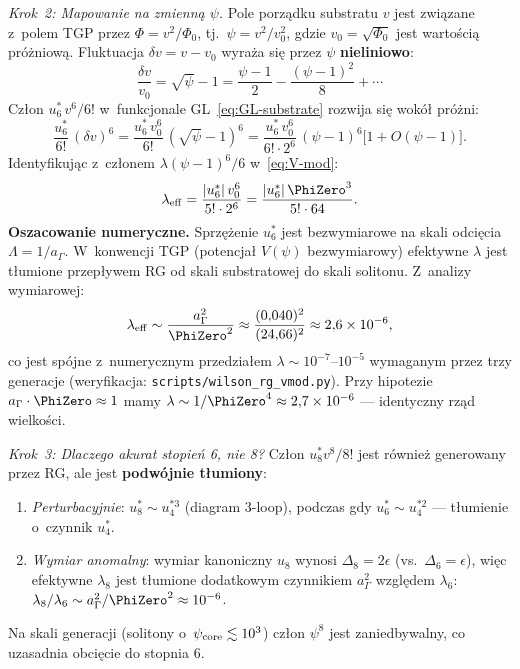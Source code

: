 \begin{proposition}
\medskip\noindent\emph{Krok~2: Mapowanie na zmienn\k{a} $\psi$.}\;
Pole porz\k{a}dku substratu $v$ jest zwi\k{a}zane z~polem TGP przez
$\Phi = v^2 / \Phi_0$, tj.~$\psi = v^2 / v_0^2$,
gdzie $v_0 = \sqrt{\Phi_0}$ jest warto\'sci\k{a} pr\'o\.zniow\k{a}.
Fluktuacja $\delta v = v - v_0$ wyra\.za si\k{e} przez $\psi$
\textbf{nieliniowo}:
\begin{equation}\label{eq:dv-to-psi}
    \frac{\delta v}{v_0} = \sqrt{\psi} - 1
    = \frac{\psi - 1}{2} - \frac{(\psi-1)^2}{8} + \cdots
\end{equation}
Cz\l{}on $u_6^*\,v^6 / 6!$ w~funkcjonale GL~\eqref{eq:GL-substrate}
rozwija si\k{e} wok\'o\l{} pr\'o\.zni:
\begin{equation}\label{eq:F-to-Vmod}
    \frac{u_6^*}{6!}\,(\delta v)^6
    = \frac{u_6^*\,v_0^6}{6!}\,(\sqrt{\psi}-1)^6
    = \frac{u_6^*\,v_0^6}{6!\cdot 2^6}\,(\psi-1)^6
      \bigl[1 + O(\psi-1)\bigr].
\end{equation}
Identyfikuj\k{a}c z~cz\l{}onem $\lambda(\psi-1)^6/6$
w~\eqref{eq:V-mod}:
\begin{equation}\label{eq:lambda-from-WF}
    \lambda_{\rm eff}
    = \frac{|u_6^*|\,v_0^6}{5!\cdot 2^6}
    = \frac{|u_6^*|\,\PhiZero^3}{5!\cdot 64}.
\end{equation}
\textbf{Oszacowanie numeryczne.}\;
Sprzężenie $u_6^*$ jest bezwymiarowe na skali odci\k{e}cia
$\Lambda = 1/a_\Gamma$.
W~konwencji TGP (potencja\l{} $V(\psi)$ bezwymiarowy)
efektywne $\lambda$ jest t\l{}umione przep\l{}ywem RG
od skali substratowej do skali solitonu.
Z~analizy wymiarowej:
\begin{equation}\label{eq:lambda-dimensional}
    \lambda_{\rm eff}
    \sim \frac{a_\Gamma^2}{\PhiZero^2}
    \approx \frac{(0{,}040)^2}{(24{,}66)^2}
    \approx 2{,}6 \times 10^{-6},
\end{equation}
co jest sp\'ojne z~numerycznym przedzia\l{}em
$\lambda \sim 10^{-7}\text{--}10^{-5}$ wymaganym przez trzy generacje
(weryfikacja: \texttt{scripts/wilson\_rg\_vmod.py}).
Przy hipotezie $a_\Gamma\cdot\PhiZero \approx 1$ mamy
$\lambda \sim 1/\PhiZero^4 \approx 2{,}7 \times 10^{-6}$
--- identyczny rz\k{a}d wielko\'sci.

\medskip\noindent\emph{Krok~3: Dlaczego akurat stopie\'n 6, nie 8?}\;
Cz\l{}on $u_8^* v^8 / 8!$ jest r\'ownie\.z generowany przez RG,
ale jest \textbf{podw\'ojnie t\l{}umiony}:
\begin{enumerate}[nosep]
  \item \emph{Perturbacyjnie}: $u_8^* \sim u_4^{*3}$ (diagram 3-loop),
    podczas gdy $u_6^* \sim u_4^{*2}$ --- t\l{}umienie o~czynnik $u_4^*$.
  \item \emph{Wymiar anomalny}: wymiar kanoniczny $u_8$ wynosi
    $\Delta_8 = 2\epsilon$ (vs.\ $\Delta_6 = \epsilon$), wi\k{e}c
    efektywne $\lambda_8$ jest t\l{}umione dodatkowym czynnikiem
    $a_\Gamma^2$ wzgl\k{e}dem $\lambda_6$:
    $\lambda_8/\lambda_6 \sim a_\Gamma^2/\PhiZero^2 \approx 10^{-6}$.
\end{enumerate}
Na skali generacji (solitony o~$\psi_{\rm core} \lesssim 10^3$)
cz\l{}on $\psi^8$ jest zaniedbywalny, co uzasadnia obci\k{e}cie
do stopnia 6.
\end{proposition}

